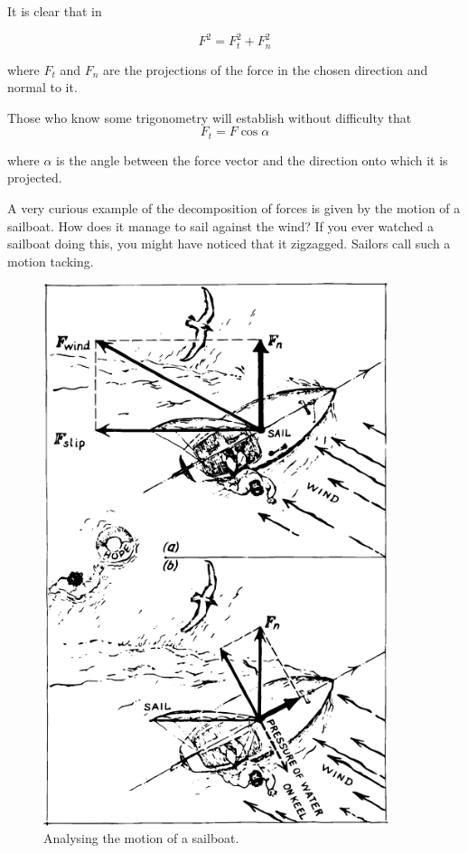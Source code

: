 It is clear that in 

\begin{equation*}%
F^{2} = F_{t}^{2} + F_{n}^{2} 
\end{equation*}

where $F_{t}$ and $F_{n}$ are the projections of
the force in the chosen direction and normal to it.  

Those who know
some trigonometry will establish without difficulty that 
\begin{equation*}%
F_{t} = F \cos \alpha
\end{equation*}

 where $\alpha$  is the angle between the force vector and the direction
onto which it is projected.  

A very curious example of the decomposition of forces is given by the
motion of a sailboat. How does it manage to sail against the wind? If
you ever watched a sailboat doing this, you might have noticed that it
zigzagged.  Sailors call such a motion tacking.  

\begin{figure}
\centering
\includegraphics[width=0.9\textwidth]{figures/fig-01-10.pdf}
\caption{Analysing the motion of a sailboat.}
\label{fig-1.10}
\end{figure}


